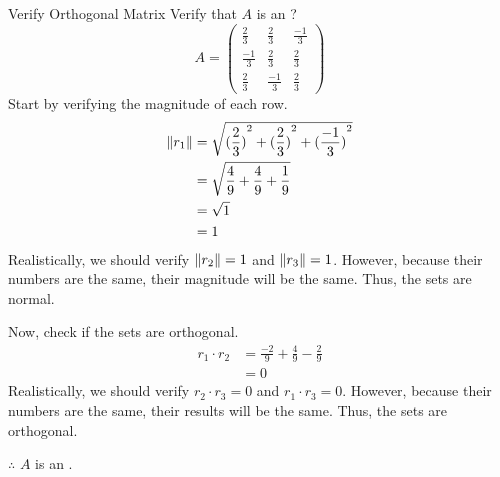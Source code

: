 \begin{example}{Verify Orthogonal Matrix}
  Verify that $A$ is an ?
  \begin{equation*}
    A =
    \begin{pmatrix}
      \frac{2}{3} & \frac{2}{3} & \frac{-1}{3} \\
      \frac{-1}{3} & \frac{2}{3} & \frac{2}{3} \\
      \frac{2}{3} & \frac{-1}{3} & \frac{2}{3}
    \end{pmatrix}
  \end{equation*}
  \tcblower{}
  Start by verifying the magnitude of each row.
  \begin{align*}
    \lVert r_{1} \rVert &= \sqrt{{(\frac{2}{3})}^{2} + {(\frac{2}{3})}^{2} + {(\frac{-1}{3})}^{2}} \\
                      &= \sqrt{\frac{4}{9} + \frac{4}{9} + \frac{1}{9}} \\
                      &= \sqrt{1} \\
                      &= 1
  \end{align*}
  Realistically, we should verify $\lVert r_{2} \rVert = 1$ and $\lVert r_{3} \rVert = 1$.
  However, because their numbers are the same, their magnitude will be the same.
  Thus, the sets are normal.

  Now, check if the sets are orthogonal.
  \begin{align*}
    r_{1} \cdot r_{2} &= \frac{-2}{9} + \frac{4}{9} - \frac{2}{9} \\
                     &= 0
  \end{align*}
  Realistically, we should verify $r_{2} \cdot r_{3} = 0$ and $r_{1} \cdot r_{3} = 0$.
  However, because their numbers are the same, their results will be the same.
  Thus, the sets are orthogonal.

  $\therefore$ $A$ is an .
\end{example}



